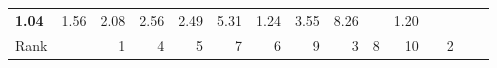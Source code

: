 \begin{tabular}{ll|rrrrrr|rrrrrrr}
  


  
  \textbf{1.04} & 1.56 & 2.08 & 2.56 & 2.49 & 5.31 & 1.24 & 3.55 & 8.26 &  & 1.20 \\

  Rank & &
  1 & 4 & 5 & 7 & 6 & 9 & 3 & 8 & 10 &  & 2 \\\hline\hline
  

\end{tabular}
